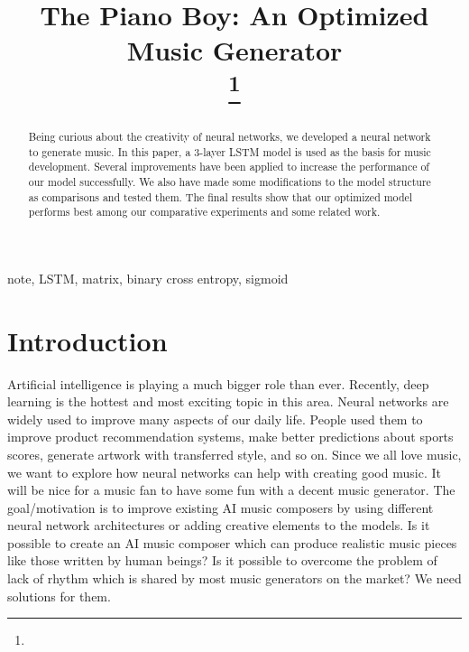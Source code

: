 \documentclass[conference]{IEEEtran}
\begin{document}
\title{The Piano Boy: An Optimized Music Generator\\
{\footnotesize \textsuperscript{}}
\thanks{}
}

\author{
\and
{}
\and
{}
}

\maketitle

\begin{abstract}
Being curious about the creativity of neural networks, we developed a neural network to generate music. In this paper, a 3-layer LSTM model is used as the basis for music development. Several improvements have been applied to increase the performance of our model successfully. We also have made some modifications to the model structure as comparisons and tested them. The final results show that our optimized model performs best among our comparative experiments and some related work.
\end{abstract}

\begin{IEEEkeywords}
note, LSTM, matrix, binary cross entropy, sigmoid
\end{IEEEkeywords}

\section{Introduction}
Artificial intelligence is playing a much bigger role than ever. Recently, deep learning is the hottest and most exciting topic in this area. Neural networks are widely used to improve many aspects of our daily life. People used them to improve product recommendation systems, make better predictions about sports scores, generate artwork with transferred style, and so on. Since we all love music, we want to explore how neural networks can help with creating good music. It will be nice for a music fan to have some fun with a decent music generator. The goal/motivation is to improve existing AI music composers by using different neural network architectures or adding creative elements to the models. Is it possible to create an AI music composer which can produce realistic music pieces like those written by human beings? Is it possible to overcome the problem of lack of rhythm which is shared by most music generators on the market? We need solutions for them. 
 
\end{document}
